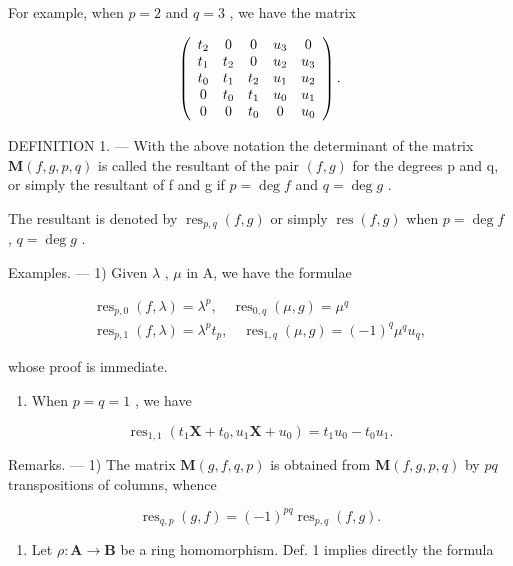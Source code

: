 For example, when \(p = 2\) and \(q = 3\) , we have the matrix

\[
\left( \begin{array}{c c c c c} t _ {2} & 0 & 0 & u _ {3} & 0 \\ t _ {1} & t _ {2} & 0 & u _ {2} & u _ {3} \\ t _ {0} & t _ {1} & t _ {2} & u _ {1} & u _ {2} \\ 0 & t _ {0} & t _ {1} & u _ {0} & u _ {1} \\ 0 & 0 & t _ {0} & 0 & u _ {0} \end{array} \right).
\]

DEFINITION 1. --- With the above notation the determinant of the matrix \(\mathbf{M}(f,g,p,q)\) is called the resultant of the pair \((f,g)\) for the degrees p and q, or simply the resultant of f and g if \(p = \deg f\) and \(q = \deg g\) .

The resultant is denoted by \(\operatorname{res}_{p,q}(f,g)\) or simply \(\operatorname{res}(f,g)\) when \(p=\deg f\) , \(q=\deg g\) .

Examples. --- 1) Given \(\lambda\) , \(\mu\) in A, we have the formulae

\[
\begin{array}{l} \operatorname{res} _ {p, 0} (f, \lambda) = \lambda^ {p}, \quad \operatorname{res} _ {0, q} (\mu , g) = \mu^ {q} \\ \operatorname{res} _ {p, 1} (f, \lambda) = \lambda^ {p} t _ {p}, \quad \operatorname{res} _ {1, q} (\mu , g) = (- 1) ^ {q} \mu^ {q} u _ {q}, \end{array}
\]

whose proof is immediate.

\begin{enumerate}
\def\labelenumi{\arabic{enumi})}
\setcounter{enumi}{1}
\tightlist
\item
  When \(p = q = 1\) , we have
\end{enumerate}

\[
\operatorname{res} _ {1, 1} \left(t _ {1} \mathbf {X} + t _ {0}, u _ {1} \mathbf {X} + u _ {0}\right) = t _ {1} u _ {0} - t _ {0} u _ {1}.
\]

Remarks. --- 1) The matrix \(\mathbf{M}(g, f, q, p)\) is obtained from \(\mathbf{M}(f, g, p, q)\) by \(pq\) transpositions of columns, whence

\[
\operatorname{res} _ {q, p} (g, f) = (- 1) ^ {p q} \operatorname{res} _ {p, q} (f, g).
\]

\begin{enumerate}
\def\labelenumi{\arabic{enumi})}
\setcounter{enumi}{1}
\tightlist
\item
  Let \(\rho: \mathbf{A} \to \mathbf{B}\) be a ring homomorphism. Def. 1 implies directly the formula
\end{enumerate}

